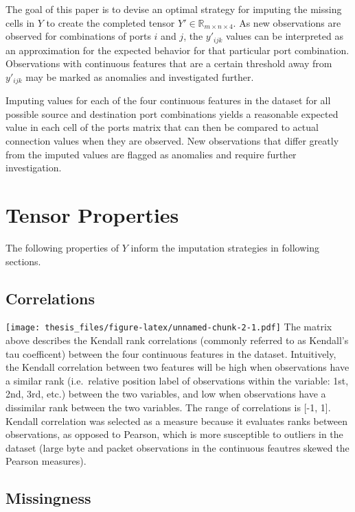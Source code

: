 \documentclass[12pt,twoside]{dukestatscithesis}
\theoremstyle{definition}
\theoremstyle{definition}
\theoremstyle{definition}
\theoremstyle{remark}
\begin{document}
The goal of this paper is to devise an optimal strategy for imputing the
missing cells in \(Y\) to create the completed tensor
\(Y' \in \mathbb{R}_{m \times n \times 4}\). As new observations are
observed for combinations of ports \(i\) and \(j\), the \(y'_{ijk}\)
values can be interpreted as an approximation for the expected behavior
for that particular port combination. Observations with continuous
features that are a certain threshold away from \(y'_{ijk}\) may be
marked as anomalies and investigated further.

Imputing values for each of the four continuous features in the dataset
for all possible source and destination port combinations yields a
reasonable expected value in each cell of the ports matrix that can then
be compared to actual connection values when they are observed. New
observations that differ greatly from the imputed values are flagged as
anomalies and require further investigation.

\section{Tensor Properties}\label{tensor-properties}

The following properties of \(Y\) inform the imputation strategies in
following sections.

\subsection{Correlations}\label{correlations}

\texttt{[image: thesis\_files/figure-latex/unnamed-chunk-2-1.pdf]} The
matrix above describes the Kendall rank correlations (commonly referred
to as Kendall's tau coefficent) between the four continuous features in
the dataset. Intuitively, the Kendall correlation between two features
will be high when observations have a similar rank (i.e.~relative
position label of observations within the variable: 1st, 2nd, 3rd, etc.)
between the two variables, and low when observations have a dissimilar
rank between the two variables. The range of correlations is {[}-1,
1{]}. Kendall correlation was selected as a measure because it evaluates
ranks between observations, as opposed to Pearson, which is more
susceptible to outliers in the dataset (large byte and packet
observations in the continuous feautres skewed the Pearson measures).

\subsection{Missingness}\label{missingness}
\end{document}
